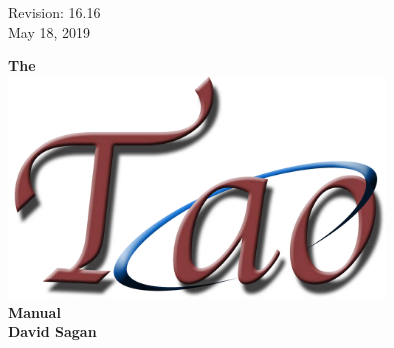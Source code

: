 \thispagestyle{empty}

\begin{flushright}
\large
Revision: 16.16 \\
May 18, 2019 \\
\end{flushright}

\vfill


{
\begin{center}
{\Huge \sf\bf The} \\
\vskip 0.1in
\includegraphics[width=10cm]{tao-logo.pdf} \\
\vskip 0.1in
{\Huge \sf\bf Manual} \\
\vskip 0.4in
{\huge \sf\bf David Sagan} \\
\end{center}
}

\vfill
\break
